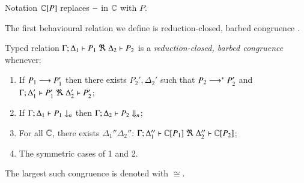 \noi 
Notation ${\Bbb C}[P]$ replaces 
$-$ in ${\Bbb C}$ with $P$.

\smallskip 

\noi The first behavioural relation we define is reduction-closed, barbed congruence \cite{HondaKYoshida95}. 

\smallskip 

\begin{definition}\rm
\label{def:rc}
	Typed relation
	$\horel{\Gamma}{\Delta_1}{P_1}{\ \Re\ }{\Delta_2}{P_2}$
	is a {\em reduction-closed, barbed congruence} whenever:
	\begin{enumerate}[1)]
		\item	If $P_1 \longrightarrow P_1'$ then there exists $P_2', \Delta_2'$ such that $P_2 \longrightarrow^* P_2'$ and
			$\horel{\Gamma}{\Delta_1'}{P_1'}{\ \Re\ }{\Delta_2'}{P_2'}$; 

			\item	If $\Gamma;\Delta_1 \vdash P_1 \downarrow_{n}$ then $\Gamma;\Delta_2 \vdash P_2 \Downarrow_{n}$; %


		\item	For all ${\Bbb C}$, there exists $\Delta_1'' \Delta_2''$: $\horel{\Gamma}{\Delta_1''}{\context{\C}{P_1}}{\ \Re\ }{\Delta_2''}{\context{\C}{P_2}}$;
		                      \item	The symmetric cases of 1 and 2.                
	\end{enumerate}
	The largest such congruence is denoted with $\cong$.
\end{definition}


